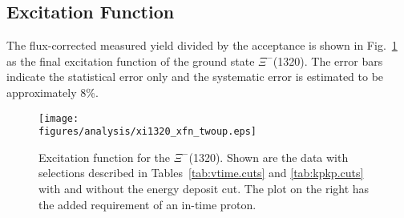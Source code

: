 \subsection{\label{sec:results.xi1320.xfn}Excitation Function}

The flux-corrected measured yield divided by the acceptance is shown in Fig.~\ref{fig:xim1320.xfn} as the final excitation function of the ground state $\Xi^-$(1320). The error bars indicate the statistical error only and the systematic error is estimated to be approximately 8\%.

\begin{figure}[bh]\begin{center}
    \texttt{[image: \\figures/analysis/xi1320\_xfn\_twoup.eps]}
    \caption[$\Xi^-$(1320) Excitation Function]{\label{fig:xim1320.xfn}Excitation function for the $\Xi^-$(1320). Shown are the data with selections described in Tables~\ref{tab:vtime.cuts} and \ref{tab:kpkp.cuts} with and without the  energy deposit cut. The plot on the right has the added requirement of an in-time proton.}
\end{center}\end{figure}

\clearpage
